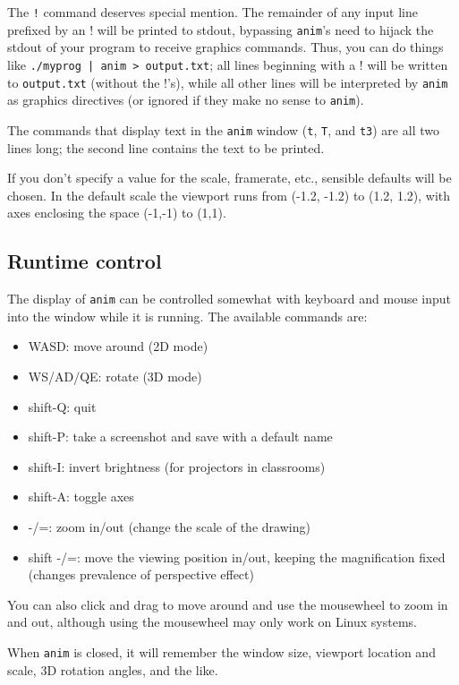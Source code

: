 \documentclass[12pt]{article}
\begin{document}
The {\tt !} command deserves special mention. The remainder of any input line prefixed by an ! will be printed to stdout, bypassing {\tt anim}'s need to hijack
the stdout of your program to receive graphics commands. Thus, you can do things like {\tt ./myprog | anim > output.txt}; all lines beginning with a ! will be 
written to {\tt output.txt} (without the !'s), while all other lines will be interpreted by {\tt anim} as graphics directives 
(or ignored if they make no sense to {\tt anim}).

The commands that display text in the {\tt anim} window ({\tt t}, {\tt T}, and {\tt t3}) are all two lines long; the second line contains the text to be printed.

If you don't specify a value for the scale, framerate, etc., sensible defaults will be chosen. In the default scale the viewport runs from (-1.2, -1.2) to (1.2, 1.2),
with axes enclosing the space (-1,-1) to (1,1). 


\subsection{Runtime control}
The display of {\tt anim} can be controlled somewhat with keyboard and mouse input into the window while it is running. The available commands are:

\begin{itemize}
\item WASD: move around (2D mode)
\item WS/AD/QE: rotate (3D mode)
\item shift-Q: quit
\item shift-P: take a screenshot and save with a default name
\item shift-I: invert brightness (for projectors in classrooms)
\item shift-A: toggle axes
\item -/=: zoom in/out (change the scale of the drawing)
\item shift -/=: move the viewing position in/out, keeping the magnification fixed (changes prevalence of perspective effect)
\end{itemize}

You can also click and drag to move around and use the mousewheel to zoom in and out, although using the mousewheel may only work on Linux systems.

When {\tt anim} is closed, it will remember the window size, viewport location and scale,
3D rotation angles, and the like.
\end{document}
